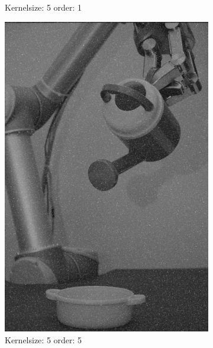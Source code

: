 \begin{figure}[H]
\begin{subfigure}[b]{0.3\textwidth}
        \caption{Kernelsize: 5 order: 1}
          \label{fig:img1_contra5_1}
    \end{subfigure}
    \begin{subfigure}[b]{0.3\textwidth}
        \includegraphics[width=\textwidth]{img1/img_1_gaus_5_5.png}
        \caption{Kernelsize: 5 order: 5}
          \label{fig:img1_contra5_5}
    \end{subfigure}
       \begin{subfigure}[b]{0.3\textwidth}

\end{subfigure}
\end{figure}
